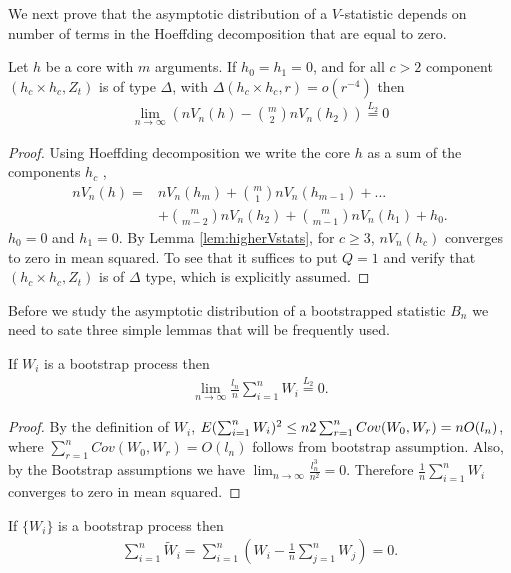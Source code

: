 We next  prove that the asymptotic distribution of a $V$-statistic depends on number of terms in the  Hoeffding decomposition that are equal to zero.

\begin{lemma}
\label{lem:equivVanila}
Let $h$ be a core with $m$ arguments. If $h_0=h_1=0$, and for all $c>2$  component  $(h_c \times h_c,Z_{t})$ is  of type $\varDelta$, with $\varDelta(h_c \times h_c,r) = o( r^{-4})$ then    
\begin{align*}
 \lim_{n \to \infty} \left( n V_n(h) -  \binom m 2  n V_n(h_2)  \right) \overset{L_2}{=} 0
\end{align*}
\end{lemma}

\begin{proof}
Using  Hoeffding decomposition we  write the core  $h$ as a sum of the components $h_c$ ,
\begin{align*}
  n V_n(h) =& n V_n(h_m) + \binom m 1 n V_n(h_{m-1}) + ... \\ 
  &+ \binom {m} {m-2} n V_n(h_{2}) + \binom {m} {m-1} n V_n(h_{1})+h_0.
\end{align*}
$h_0=0$ and  $h_1=0$. By  Lemma \ref{lem:higherVstats}, for $c \geq 3$, $n V_n(h_{c})$  converges to zero in mean squared. To see that it suffices to put $Q=1$ and verify that  $(h_c \times h_c,Z_t)$ is of $\varDelta$ type, which  is explicitly assumed.
\end{proof}

Before we study the asymptotic distribution of a bootstrapped statistic $B_n$ we need to sate three simple lemmas that will be frequently used.  
\begin{lemma}
\label{lem:meanWi}
If $W_i$ is a bootstrap process then
\begin{align*}
\lim_{n \to \infty} \frac {l_n}{ n} \sum_{i=1}^n W_i \overset{L_2}{=} 0.
\end{align*}
\end{lemma}
\begin{proof}
By the definition of $W_i$, $E (\sum_{i=1}^n W_i)^2 \leq n 2\sum_{r=1}^n Cov(W_0,W_r)=  nO(l_n)$, where $\sum_{r=1}^n Cov(W_0,W_r)=  O(l_n)$ follows from bootstrap assumption.  Also, by the  Bootstrap assumptions we have $\lim_{n \to \infty} \frac {l_n^3}{n^2} =0 $. Therefore $\frac{1} {n} \sum_{i=1}^{n}W_i$ converges to zero in mean squared.
\end{proof}


\begin{lemma}
\label{stmt:obviousD}
If $\{W_i\}$ is a bootstrap process then
\begin{align*}
\sum_{i=1}^n \tilde W_i = \sum_{i=1}^n  \left( W_i - \frac 1 n \sum_{j=1}^n  W_j \right) = 0. 
\end{align*}
\end{lemma}

